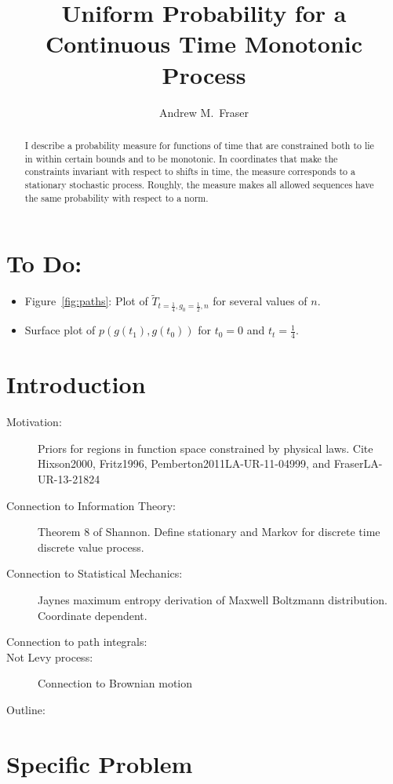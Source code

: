 \documentclass[12pt]{article} \usepackage{amsmath,amsfonts}
\title{Uniform Probability for a Continuous Time Monotonic Process }
\author{Andrew M.\ Fraser}
\begin{document}
\maketitle
\begin{abstract}
  I describe a probability measure for functions of time that are
  constrained both to lie in within certain bounds and to be
  monotonic.  In coordinates that make the constraints invariant with
  respect to shifts in time, the measure corresponds to a stationary
  stochastic process.  Roughly, the measure makes all allowed
  sequences have the same probability with respect to a norm.
\end{abstract}

\section*{To Do:}
\label{sec:do}

\begin{itemize}
\item Figure~\ref{fig:paths}: Plot of
  $\tilde T_{t=\frac{1}{4},g_0=\frac{1}{2},n}$ for several values of
  $n$.
\item Surface plot of $p(g(t_1),g(t_0))$ for $t_0=0$ and
  $t_t=\frac{1}{4}$.
\end{itemize}

\section{Introduction}
\label{sec:introduction}
\begin{description}
\item[Motivation:] Priors for regions in function space constrained by
  physical laws.  Cite Hixson2000, Fritz1996,
  Pemberton2011LA-UR-11-04999, and FraserLA-UR-13-21824
\item[Connection to Information Theory:] Theorem 8 of Shannon.  Define
  stationary and Markov for discrete time discrete value process.
\item[Connection to Statistical Mechanics:] Jaynes maximum entropy
  derivation of Maxwell Boltzmann distribution.  Coordinate dependent.
\item[Connection to path integrals:]
\item[Not Levy process:] Connection to Brownian motion
\item[Outline:]
\end{description}

\section{Specific Problem}
\label{sec:specific}
\end{document}
